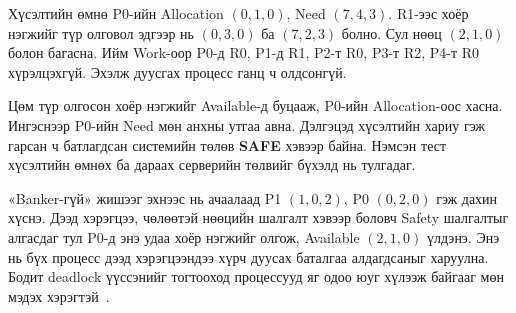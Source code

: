 
 Хүсэлтийн өмнө P0-ийн Allocation $(0,1,0)$, Need $(7,4,3)$. R1-ээс хоёр нэгжийг түр олговол эдгээр нь $(0,3,0)$ ба $(7,2,3)$ болно. Сул нөөц $(2,1,0)$ болон багасна. Ийм Work-оор P0-д R0, P1-д R1, P2-т R0, P3-т R2, P4-т R0 хүрэлцэхгүй. Эхэлж дуусгах процесс ганц ч олдсонгүй.


Цөм түр олгосон хоёр нэгжийг Available-д буцааж, P0-ийн Allocation-оос хасна. Ингэснээр P0-ийн Need мөн анхны утгаа авна. Дэлгэцэд хүсэлтийн хариу  гэж гарсан ч батлагдсан системийн төлөв \textbf{SAFE} хэвээр байна. Нэмсэн тест хүсэлтийн өмнөх ба дараах серверийн төлвийг бүхэлд нь тулгадаг.

 «Banker-гүй» жишээг эхнээс нь ачаалаад P1 $(1,0,2)$, P0 $(0,2,0)$ гэж дахин хүснэ. Дээд хэрэгцээ, чөлөөтэй нөөцийн шалгалт хэвээр боловч Safety шалгалтыг алгасдаг тул P0-д энэ удаа хоёр нэгжийг олгож, Available $(2,1,0)$ үлдэнэ. Энэ нь бүх процесс дээд хэрэгцээндээ хүрч дуусах баталгаа алдагдсаныг харуулна. Бодит deadlock үүссэнийг тогтооход процессууд яг одоо юуг хүлээж байгааг мөн мэдэх хэрэгтэй~\cite{osc,coffman}.
\newpage
